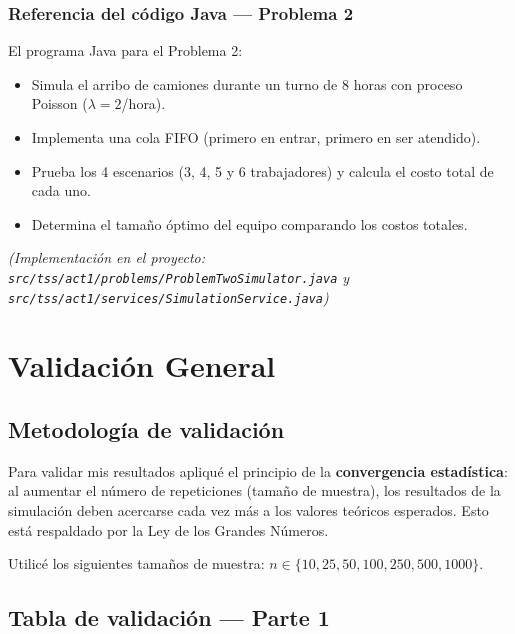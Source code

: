 \documentclass[12pt,a4paper]{article}
\begin{document}
\subsubsection{Referencia del código Java — Problema 2}

\begin{javabox}
El programa Java para el Problema 2:
\begin{itemize}
  \item Simula el arribo de camiones durante un turno de 8 horas con proceso Poisson ($\lambda = 2$/hora).
  \item Implementa una cola FIFO (primero en entrar, primero en ser atendido).
  \item Prueba los 4 escenarios (3, 4, 5 y 6 trabajadores) y calcula el costo total de cada uno.
  \item Determina el tamaño óptimo del equipo comparando los costos totales.
\end{itemize}
\textit{(Implementación en el proyecto: \texttt{src/tss/act1/problems/ProblemTwoSimulator.java} y \texttt{src/tss/act1/services/SimulationService.java})}
\end{javabox}

\newpage

\section{Validación General}

\subsection{Metodología de validación}

Para validar mis resultados apliqué el principio de la \textbf{convergencia estadística}: al aumentar el número de repeticiones (tamaño de muestra), los resultados de la simulación deben acercarse cada vez más a los valores teóricos esperados. Esto está respaldado por la Ley de los Grandes Números.

Utilicé los siguientes tamaños de muestra: $n \in \{10, 25, 50, 100, 250, 500, 1000\}$.

\subsection{Tabla de validación — Parte 1}
\end{document}

